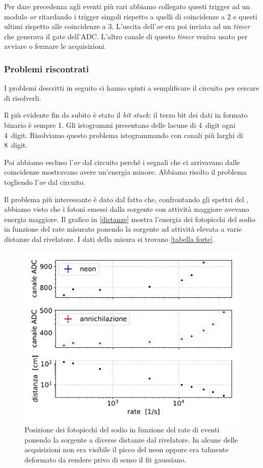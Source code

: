 
Per dare precedenza agli eventi più rari abbiamo collegato questi trigger ad un modulo \emph{or} ritardando i trigger singoli rispetto a quelli di coincidenze a 2 e questi ultimi rispetto alle coincidenze a 3. L'uscita dell'\emph{or} era poi inviata ad un \emph{timer} che generava il gate dell'ADC. L'altro canale di questo \emph{timer} veniva usato per avviare o fermare le acquisizioni.

\subsubsection{Problemi riscontrati}

I problemi descritti in seguito ci hanno spinti a semplificare il circuito per cercare di risolverli.

Il più evidente fin da subito è stato il \emph{bit stuck}: il terzo bit dei dati in formato binario è sempre 1. Gli istogrammi presentano delle lacune di \SI{4}{digit} ogni \SI{4}{digit}. Risolviamo questo problema istogrammando con canali più larghi di \SI{8}{digit}.

Poi abbiamo escluso l'\emph{or} dal circuito perché i segnali che ci arrivavano dalle coincidenze mostravano avere un'energia minore. Abbiamo risolto il problema togliendo l'\emph{or} dal circuito.

Il problema più interessante è dato dal fatto che, confrontando gli spettri del \na{}, abbiamo visto che i fotoni emessi dalla sorgente con attività maggiore avevano energia maggiore.
Il grafico in \autoref{distanze} mostra l'energia dei fotopicchi del sodio in funzione del rate misurato ponendo la sorgente ad attività elevata a varie distanze dal rivelatore.
I dati della misura si trovano \autoref{tabella forte}.


\begin{figure}[h]
\centering
\includegraphics[width=25 em]{immagini/naforte}
\caption{Posizione dei fotopicchi del sodio in funzione del rate di eventi ponendo la sorgente a diverse distanze dal rivelatore. In alcune delle acquisizioni non era visibile il picco del neon oppure era talmente deformato da rendere privo di senso il fit gaussiano.}
\label{distanze}
\end{figure}

